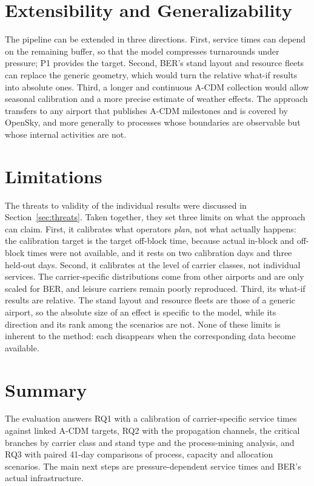 \section{Extensibility and Generalizability}

The pipeline can be extended in three directions. First, service times can depend on the remaining buffer, so that the model compresses turnarounds under pressure; P1 provides the target. Second, BER's stand layout and resource fleets can replace the generic geometry, which would turn the relative what-if results into absolute ones. Third, a longer and continuous A-CDM collection would allow seasonal calibration and a more precise estimate of weather effects. The approach transfers to any airport that publishes A-CDM milestones and is covered by OpenSky, and more generally to processes whose boundaries are observable but whose internal activities are not.

\section{Limitations}

The threats to validity of the individual results were discussed in Section~\ref{sec:threats}. Taken together, they set three limits on what the approach can claim. First, it calibrates what operators \emph{plan}, not what actually happens: the calibration target is the target off-block time, because actual in-block and off-block times were not available, and it rests on two calibration days and three held-out days. Second, it calibrates at the level of carrier classes, not individual services. The carrier-specific distributions come from other airports and are only scaled for BER, and leisure carriers remain poorly reproduced. Third, its what-if results are relative. The stand layout and resource fleets are those of a generic airport, so the absolute size of an effect is specific to the model, while its direction and its rank among the scenarios are not. None of these limits is inherent to the method: each disappears when the corresponding data become available.

\section{Summary}

The evaluation answers RQ1 with a calibration of carrier-specific service times against linked A-CDM targets, RQ2 with the propagation channels, the critical branches by carrier class and stand type and the process-mining analysis, and RQ3 with paired 41-day comparisons of process, capacity and allocation scenarios. The main next steps are pressure-dependent service times and BER's actual infrastructure.
